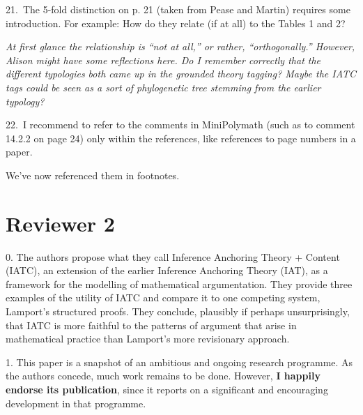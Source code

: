 \begin{mdframed}[backgroundcolor=red!10]
21.~The 5-fold distinction on p. 21 (taken from Pease and Martin) requires some introduction. For example: How do they relate (if at all) to the Tables 1 and 2?
\end{mdframed}

\emph{At first glance the relationship is ``not at all,'' or rather, ``orthogonally.''  However, Alison might have some reflections here.  Do I remember correctly that the different typologies both came up in the grounded theory tagging?  Maybe the IATC tags could be seen as a sort of phylogenetic tree stemming from the earlier typology?}

\begin{mdframed}[backgroundcolor=orange!10]
22.~I recommend to refer to the comments in MiniPolymath (such as to comment 14.2.2 on page 24) only within the references, like references to page numbers in a paper.
\end{mdframed}

We've now referenced them in footnotes.

\section{Reviewer 2}\label{rev1}

\begin{mdframed}[backgroundcolor=orange!10]
0. The authors propose what they call Inference Anchoring Theory + Content (IATC), an extension of the earlier Inference Anchoring Theory (IAT), as a framework for the modelling of mathematical argumentation. They provide three examples of the utility of IATC and compare it to one competing system, Lamport's structured proofs. They conclude, plausibly if perhaps unsurprisingly, that IATC is more faithful to the patterns of argument that arise in mathematical practice than Lamport's more revisionary approach.
\end{mdframed}


\begin{mdframed}[backgroundcolor=orange!10]
1. This paper is a snapshot of an ambitious and ongoing research programme. As the authors concede, much work remains to be done. However, \textbf{I happily endorse its publication}, since it reports on a significant and encouraging development in that programme.
\end{mdframed}

